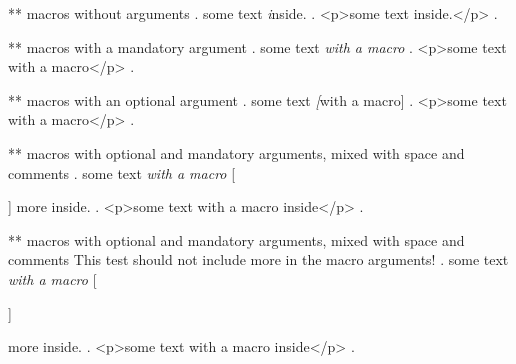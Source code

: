 ** macros without arguments
.
some text \emph inside.
.
<p>some text inside.</p>
.

** macros with a mandatory argument
.
some text \emph{with a macro}
.
<p>some text with a macro</p>
.

** macros with an optional argument
.
some text \emph[with a macro]
.
<p>some text with a macro</p>
.

** macros with optional and mandatory arguments, mixed with space and comments
.
some text \emph{with a macro} [%

 ]
 {more} inside.
.
<p>some text with a macro inside</p>
.


** macros with optional and mandatory arguments, mixed with space and comments
This test should not include {more} in the macro arguments!
.
some text \emph{with a macro} [%

 ]%

  {more} inside.
.
<p>some text with a macro inside</p>
.
